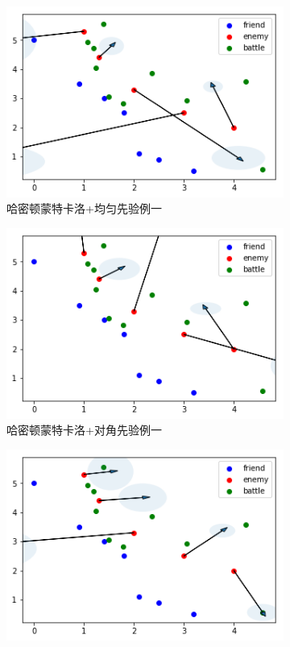 \documentclass{sicnuthesis}
\begin{document}
\begin{figure}[htb]
  \begin{subfigure}[b]{0.45\linewidth}
    \includegraphics[width=\linewidth]{Sampling31.png}
    \caption{哈密顿蒙特卡洛+均匀先验例一}
  \end{subfigure}
  \begin{subfigure}[b]{0.45\linewidth}
    \includegraphics[width=\linewidth]{Sampling32.png}
    \caption{哈密顿蒙特卡洛+对角先验例一}
  \end{subfigure}
  \begin{subfigure}[b]{0.45\linewidth}
    \includegraphics[width=\linewidth]{Sampling41.png}

\end{subfigure}
\end{figure}
\end{document}
